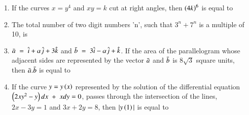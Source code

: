 \documentclass[journal,,12pt,onecolumn]{IEEEtran}
\theoremstyle{remark}
\begin{document}
\begin{enumerate}
 
 \item If the curves $x=y^4$ and $xy=k$ cut at right angles, then $\left(4k\right)^6$ is equal to
 \item The total number of two digit numbers 'n', such that $3^n+7^n$ is a multiple of 10, is
 \item $\Bar{a}\;=\;\hat{i}+\alpha \hat{j}+3\hat{k}$ and $\Bar{b}\;=\;3\hat{i}-\alpha \hat{j}+\hat{k}$. If the area of the parallelogram whose adjacent sides are represented by the vector $\Bar{a}$ and $\Bar{b}$ is $8\sqrt{3}$ square units, then $\Bar{a}.\Bar{b}$ is equal to
 \item If the curve $y=y\left(x\right)$ represented by the solution of the differential equation $\left(2xy^2-y\right)dx\;+\;xdy=0$, passes through the intersection of the lines, $2x-3y=1$ and $3x+2y=8$, then $|y\left(1\right)|$ is equal to 
 \end{enumerate}
 
\end{document}
